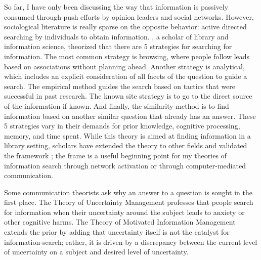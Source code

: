 So far, I have only been discussing the way that information is
passively consumed through push efforts by opinion leaders and social
networks. However, sociological literature is really sparse on the
opposite behavior: active directed searching by individuals to obtain
information. \citep{pejtersenDesignComputeraidedUsersystem1984}, a scholar of library and information
science, theorized that there are 5 strategies for searching for
information. The most common strategy is browsing, where people follow
leads based on associations without planning ahead. Another strategy is
analytical, which includes an explicit consideration of all facets of
the question to guide a search. The empirical method guides the search
based on tactics that were successful in past research. The known site
strategy is to go to the direct source of the information if known. And
finally, the similarity method is to find information based on another
similar question that already has an answer. These 5 strategies vary in
their demands for prior knowledge, cognitive processing, memory, and
time spent. While this theory is aimed at finding information in a
library setting, scholars have extended the theory to other fields and
validated the framework \citep{fidelHumanInformationInteraction2012}; the frame is a useful beginning
point for my theories of information search through network activation
or through computer-mediated communication.

Some communication theorists ask why an answer to a question is sought
in the first place. The Theory of Uncertainty Management \citep{brashersCommunicationUncertaintyManagement2001}
professes that people search for information when their uncertainty
around the subject leads to anxiety or other cognitive harms. The Theory
of Motivated Information Management \citep{afifiSeekingInformationSexual2006, afifiTheoryMotivatedInformation2004}
extends the prior by adding that uncertainty itself is not the catalyst
for information-search; rather, it is driven by a discrepancy between
the current level of uncertainty on a subject and desired level of
uncertainty.

